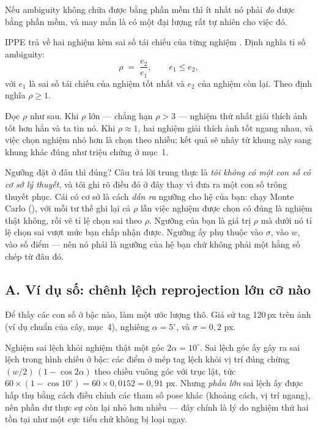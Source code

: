 \documentclass[../../marker.tex]{subfiles}
\begin{document}
Nếu ambiguity không chữa được bằng phần mềm thì ít nhất nó phải \emph{đo} được bằng phần mềm, và may mắn là có một đại lượng rất tự nhiên cho việc đó.

IPPE trả về hai nghiệm kèm sai số tái chiếu của từng nghiệm \cite{collins2014ippe}. Định nghĩa tỉ số ambiguity:
\[
\rho \;=\; \frac{e_2}{e_1}, \qquad e_1 \le e_2,
\]
với \(e_1\) là sai số tái chiếu của nghiệm tốt nhất và \(e_2\) của nghiệm còn lại. Theo định nghĩa \(\rho \ge 1\).

Đọc \(\rho\) như sau. Khi \(\rho\) lớn --- chẳng hạn \(\rho > 3\) --- nghiệm thứ nhất giải thích ảnh tốt hơn hẳn và ta tin nó. Khi \(\rho \approx 1\), hai nghiệm giải thích ảnh tốt ngang nhau, và việc chọn nghiệm nhỏ hơn là chọn theo nhiễu; kết quả sẽ nhảy từ khung này sang khung khác đúng như triệu chứng ở mục~1.

Ngưỡng đặt ở đâu thì đúng? Câu trả lời trung thực là \emph{tôi không có một con số có cơ sở lý thuyết}, và tôi ghi rõ điều đó ở đây thay vì đưa ra một con số trông thuyết phục. Cái có cơ sở là cách \emph{dẫn ra} ngưỡng cho hệ của bạn: chạy Monte Carlo (), với mỗi tư thế ghi lại cả \(\rho\) lẫn việc nghiệm được chọn có đúng là nghiệm thật không, rồi vẽ tỉ lệ chọn sai theo \(\rho\). Ngưỡng của bạn là giá trị \(\rho\) mà dưới nó tỉ lệ chọn sai vượt mức bạn chấp nhận được. Ngưỡng ấy phụ thuộc vào \(\sigma\), vào \(w\), vào số điểm --- nên nó phải là ngưỡng của hệ bạn chứ không phải một hằng số chép từ đâu đó.

\subsection{A. Ví dụ số: chênh lệch reprojection lớn cỡ nào}

Để thấy các con số ở bậc nào, làm một ước lượng thô. Giả sử tag 120\,px trên ảnh (ví dụ chuẩn của cây,  mục~4), nghiêng \(\alpha = 5^\circ\), và \(\sigma = 0{,}2\) px.

Nghiệm sai lệch khỏi nghiệm thật một góc \(2\alpha = 10^\circ\). Sai lệch góc ấy gây ra sai lệch trong hình chiếu ở bậc: các điểm ở mép tag lệch khỏi vị trí đúng chừng \((w/2)\,(1-\cos 2\alpha)\) theo chiều vuông góc với trục lật, tức \(60 \times (1 - \cos 10^\circ) = 60 \times 0{,}0152 = 0{,}91\) px. Nhưng \emph{phần lớn} sai lệch ấy được hấp thụ bằng cách điều chỉnh các tham số pose khác (khoảng cách, vị trí ngang), nên phần dư thực sự còn lại nhỏ hơn nhiều --- đây chính là lý do nghiệm thứ hai tồn tại như một cực tiểu chứ không bị loại ngay.
\end{document}
